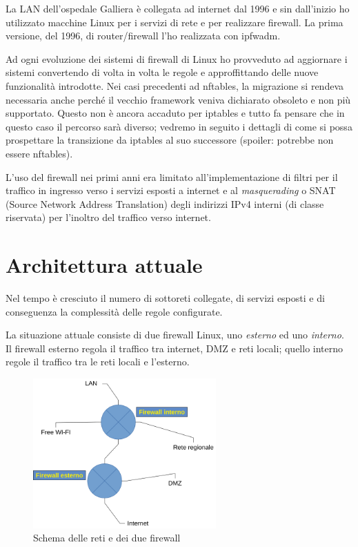 La LAN dell'ospedale Galliera è collegata ad internet dal 1996 e sin
dall'inizio ho utilizzato macchine Linux per i servizi di rete e per
realizzare firewall.  La prima versione, del 1996, di router/firewall l'ho
realizzata con ipfwadm.

Ad ogni evoluzione dei sistemi di firewall di Linux ho provveduto ad
aggiornare i sistemi convertendo di volta in volta le regole e approffittando
delle nuove funzionalità introdotte.  Nei casi precedenti ad nftables, la
migrazione si rendeva necessaria anche perché il vecchio framework veniva
dichiarato obsoleto e non più supportato.  Questo non è ancora accaduto per
iptables e tutto fa pensare che in questo caso il percorso sarà diverso;
vedremo in seguito i dettagli di come si possa prospettare la transizione da
iptables al suo successore (spoiler: potrebbe non essere nftables).

L'uso del firewall nei primi anni era limitato all'implementazione di filtri
per il traffico in ingresso verso i servizi esposti a internet e al
{\em masquerading} o SNAT (Source Network Address Translation) degli indirizzi
IPv4 interni (di classe riservata) per l'inoltro del traffico verso internet.

\section{Architettura attuale}

Nel tempo è cresciuto il numero di sottoreti collegate, di servizi esposti e
di conseguenza la complessità delle regole configurate.

La situazione attuale consiste di due firewall Linux, uno {\em esterno} ed uno
{\em interno}.  Il firewall esterno regola il traffico tra internet, DMZ e
reti locali; quello interno regole il traffico tra le reti locali e l'esterno.

\begin{figure}
\begin{center}
	  \includegraphics[width=7cm]{rete.png}
	  \caption{Schema delle reti e dei due firewall}
	  \label{fig:rete}
\end{center}
\end{figure}


